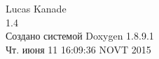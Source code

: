 \vspace*{7cm}
\begin{center}%
\LARGE {Lucas Kanade}\\\large{1.4}\\
\vspace*{1cm}
{\large Создано системой Doxygen 1.8.9.1}\\
\vspace*{0.5cm}
{\small Чт. июня 11 16:09:36 NOVT 2015}\\
\end{center}